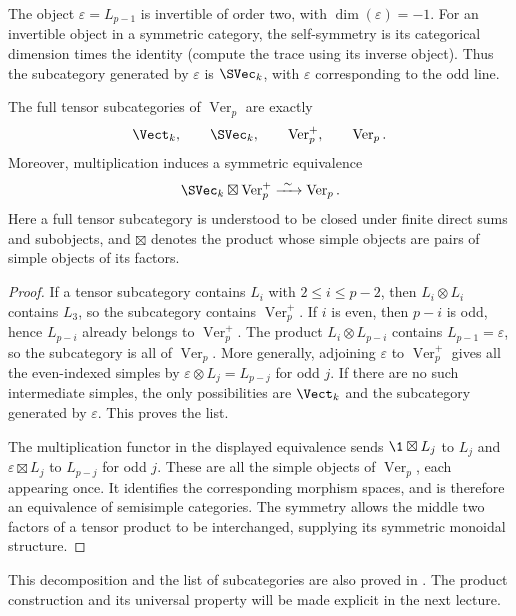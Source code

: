 The object $\varepsilon=L_{p-1}$ is invertible of order two, with
$\dim(\varepsilon)=-1$. For an invertible object in a symmetric
category, the self-symmetry is its categorical dimension times the
identity (compute the trace using its inverse object). Thus the
subcategory generated by $\varepsilon$ is $\SVec_k$, with
$\varepsilon$ corresponding to the odd line.

\begin{proposition}\label{prop:lec17-subcategories}
The full tensor subcategories of $\operatorname{Ver}_p$ are exactly
\[
 \Vect_k,\qquad \SVec_k,\qquad
 \operatorname{Ver}_p^+,\qquad\operatorname{Ver}_p.
\]
Moreover, multiplication induces a symmetric equivalence
\[
 \SVec_k\boxtimes\operatorname{Ver}_p^+
 \xrightarrow{\ \sim\ }\operatorname{Ver}_p.
\]
Here a full tensor subcategory is understood to be closed under finite
direct sums and subobjects, and $\boxtimes$ denotes the product whose
simple objects are pairs of simple objects of its factors.
\end{proposition}
\begin{proof}
If a tensor subcategory contains $L_i$ with $2\leq i\leq p-2$,
then $L_i\otimes L_i$ contains $L_3$, so the subcategory contains
$\operatorname{Ver}_p^+$. If $i$ is even, then $p-i$ is odd, hence
$L_{p-i}$ already belongs to $\operatorname{Ver}_p^+$. The product
$L_i\otimes L_{p-i}$ contains $L_{p-1}=\varepsilon$, so the
subcategory is all of $\operatorname{Ver}_p$. More generally,
adjoining $\varepsilon$ to $\operatorname{Ver}_p^+$ gives all the
even-indexed simples by $\varepsilon\otimes L_j=L_{p-j}$ for odd $j$.
If there are no such
intermediate simples, the only possibilities are $\Vect_k$ and the
subcategory generated by $\varepsilon$. This proves the list.

The multiplication functor in the displayed equivalence sends
$\1\boxtimes L_j$ to $L_j$ and
$\varepsilon\boxtimes L_j$ to $L_{p-j}$ for odd $j$. These are all
the simple objects of $\operatorname{Ver}_p$, each appearing once.
It identifies the corresponding morphism spaces, and is therefore
an equivalence of semisimple categories. The symmetry allows the
middle two factors of a tensor product to be interchanged, supplying
its symmetric monoidal structure.
\end{proof}

This decomposition and the list of subcategories are also proved in
\cite[Proposition 3.3]{OstrikVerlinde}. The product construction and its
universal property will be made explicit in the next lecture.
